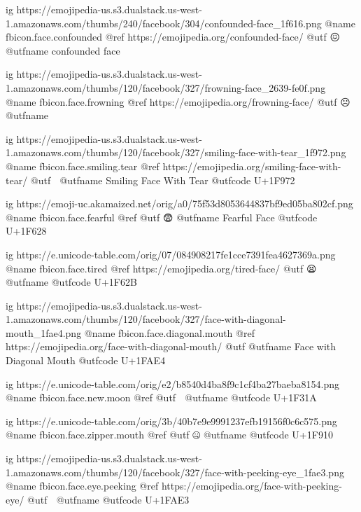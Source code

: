 	ig https://emojipedia-us.s3.dualstack.us-west-1.amazonaws.com/thumbs/240/facebook/304/confounded-face_1f616.png
	@name fbicon.face.confounded
	@ref https://emojipedia.org/confounded-face/
	@utf 😖
	@utfname confounded face

	ig https://emojipedia-us.s3.dualstack.us-west-1.amazonaws.com/thumbs/120/facebook/327/frowning-face_2639-fe0f.png
	@name fbicon.face.frowning
	@ref https://emojipedia.org/frowning-face/
	@utf ☹️
	@utfname

	ig https://emojipedia-us.s3.dualstack.us-west-1.amazonaws.com/thumbs/120/facebook/327/smiling-face-with-tear_1f972.png
	@name fbicon.face.smiling.tear
	@ref https://emojipedia.org/smiling-face-with-tear/
	@utf 🥲
	@utfname Smiling Face With Tear
	@utfcode U+1F972

	ig https://emoji-uc.akamaized.net/orig/a0/75f53d8053644837bf9ed05ba802cf.png
	@name fbicon.face.fearful
	@ref
	@utf 😨
	@utfname Fearful Face
	@utfcode U+1F628

	ig https://e.unicode-table.com/orig/07/084908217fe1cce7391fea4627369a.png
	@name fbicon.face.tired
	@ref https://emojipedia.org/tired-face/
	@utf 😫
	@utfname
	@utfcode U+1F62B

	ig https://emojipedia-us.s3.dualstack.us-west-1.amazonaws.com/thumbs/120/facebook/327/face-with-diagonal-mouth_1fae4.png
	@name fbicon.face.diagonal.mouth
	@ref https://emojipedia.org/face-with-diagonal-mouth/
	@utf
	@utfname Face with Diagonal Mouth
	@utfcode U+1FAE4

	ig https://e.unicode-table.com/orig/e2/b8540d4ba8f9c1cf4ba27baeba8154.png
	@name fbicon.face.new.moon
	@ref
	@utf 🌚
	@utfname
	@utfcode U+1F31A

	ig https://e.unicode-table.com/orig/3b/40b7e9e9991237efb19156f0c6c575.png
	@name fbicon.face.zipper.mouth
	@ref
	@utf 🤐
	@utfname
	@utfcode U+1F910

	ig https://emojipedia-us.s3.dualstack.us-west-1.amazonaws.com/thumbs/120/facebook/327/face-with-peeking-eye_1fae3.png
	@name fbicon.face.eye.peeking
	@ref https://emojipedia.org/face-with-peeking-eye/
	@utf 🫣
	@utfname
	@utfcode U+1FAE3

\fi
